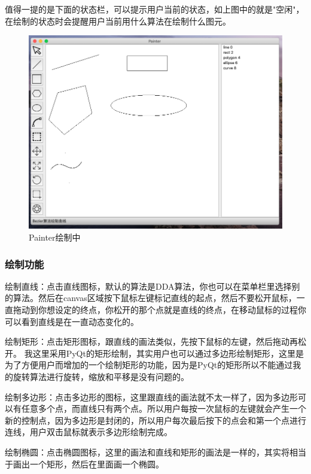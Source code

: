 \documentclass[a4paper,UTF8]{article}
\theoremstyle{definition}
\begin{document}
值得一提的是下面的状态栏，可以提示用户当前的状态，如上图中的就是"空闲"，在绘制的状态时会提醒用户当前用什么算法在绘制什么图元。

\begin{figure}[H]
    \centering
    \includegraphics[scale=0.5]{Painting.png}
    \caption{Painter绘制中}
\end{figure}

\subsubsection{绘制功能}

绘制直线：点击直线图标，默认的算法是DDA算法，你也可以在菜单栏里选择别的算法。然后在canvas区域按下鼠标左键标记直线的起点，然后不要松开鼠标，一直拖动到你想设定的终点，你松开的那个点就是直线的终点，在移动鼠标的过程你可以看到直线是在一直动态变化的。

绘制矩形：点击矩形图标，跟直线的画法类似，先按下鼠标的左键，然后拖动再松开。 我这里采用PyQt的矩形绘制，其实用户也可以通过多边形绘制矩形，这里是为了方便用户而增加的一个绘制矩形的功能，因为是PyQt的矩形所以不能通过我的旋转算法进行旋转，缩放和平移是没有问题的。

绘制多边形：点击多边形的图标，这里跟直线的画法就不太一样了，因为多边形可以有任意多个点，而直线只有两个点。所以用户每按一次鼠标的左键就会产生一个新的控制点，因为多边形是封闭的，所以用户每次最后按下的点会和第一个点进行连线，用户双击鼠标就表示多边形绘制完成。

绘制椭圆：点击椭圆图标，这里的画法和直线和矩形的画法是一样的，其实将相当于画出一个矩形，然后在里面画一个椭圆。
\end{document}

